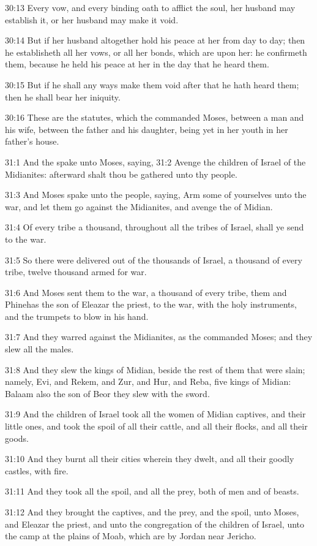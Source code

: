 30:13 Every vow, and every binding oath to afflict the soul, her husband may establish it, or her husband may make it void.

30:14 But if her husband altogether hold his peace at her from day to day; then he establisheth all her vows, or all her bonds, which are upon her: he confirmeth them, because he held his peace at her in the day that he heard them.

30:15 But if he shall any ways make them void after that he hath heard them; then he shall bear her iniquity.

30:16 These are the statutes, which the \LORD commanded Moses, between a man and his wife, between the father and his daughter, being yet in her youth in her father's house.

31:1 And the \LORD spake unto Moses, saying, 31:2 Avenge the children of Israel of the Midianites: afterward shalt thou be gathered unto thy people.

31:3 And Moses spake unto the people, saying, Arm some of yourselves unto the war, and let them go against the Midianites, and avenge the \LORD of Midian.

31:4 Of every tribe a thousand, throughout all the tribes of Israel, shall ye send to the war.

31:5 So there were delivered out of the thousands of Israel, a thousand of every tribe, twelve thousand armed for war.

31:6 And Moses sent them to the war, a thousand of every tribe, them and Phinehas the son of Eleazar the priest, to the war, with the holy instruments, and the trumpets to blow in his hand.

31:7 And they warred against the Midianites, as the \LORD commanded Moses; and they slew all the males.

31:8 And they slew the kings of Midian, beside the rest of them that were slain; namely, Evi, and Rekem, and Zur, and Hur, and Reba, five kings of Midian: Balaam also the son of Beor they slew with the sword.

31:9 And the children of Israel took all the women of Midian captives, and their little ones, and took the spoil of all their cattle, and all their flocks, and all their goods.

31:10 And they burnt all their cities wherein they dwelt, and all their goodly castles, with fire.

31:11 And they took all the spoil, and all the prey, both of men and of beasts.

31:12 And they brought the captives, and the prey, and the spoil, unto Moses, and Eleazar the priest, and unto the congregation of the children of Israel, unto the camp at the plains of Moab, which are by Jordan near Jericho.

